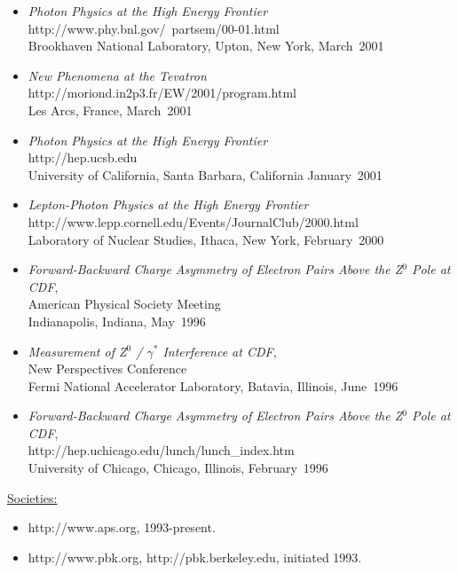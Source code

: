 \documentclass [12pt]{report}
\begin{document}
\begin{itemize}
{College of William and Mary, Williamsburg, Virginia, May~2002}
\item{{\em Photon Physics at the High Energy Frontier}\\ 
{http://www.phy.bnl.gov/~partsem/00-01.html}\\
Brookhaven National Laboratory, Upton, New York, March~2001}
\item{{\em New Phenomena at the Tevatron}\\ 
{http://moriond.in2p3.fr/EW/2001/program.html}\\
Les Arcs, France, March~2001}
\item{{\em Photon Physics at the High Energy Frontier}\\ 
{http://hep.ucsb.edu}\\
University of California, Santa Barbara, California January~2001}
\item{{\em Lepton-Photon Physics at the High Energy Frontier}\\ 
{http://www.lepp.cornell.edu/Events/JournalClub/2000.html}\\
Laboratory of Nuclear Studies, Ithaca, New York, February~2000}
\item{{\em Forward-Backward Charge Asymmetry of Electron Pairs Above the 
Z$^0$ Pole at CDF},\\ 
American Physical Society Meeting\\
Indianapolis, Indiana, May~1996}
\item{{\em Measurement of Z$^0$ / $\gamma^{*}$ Interference at CDF},\\ 
New Perspectives Conference\\
Fermi National Accelerator Laboratory, Batavia, Illinois, June~1996}
\item{{\em Forward-Backward Charge Asymmetry of Electron Pairs Above the 
Z$^0$ Pole at CDF},\\ 
{http://hep.uchicago.edu/lunch/lunch_index.htm}\\
University of Chicago, Chicago, Illinois, February~1996}
\end{itemize}


\noindent\underline{Societies:}
\begin{itemize}
\item {
{http://www.aps.org}, 1993-present.}
\item {
{http://www.pbk.org}, 
{http://pbk.berkeley.edu}, initiated 1993. }
\end{itemize}
\clearpage 
\newpage 
\end{document}
